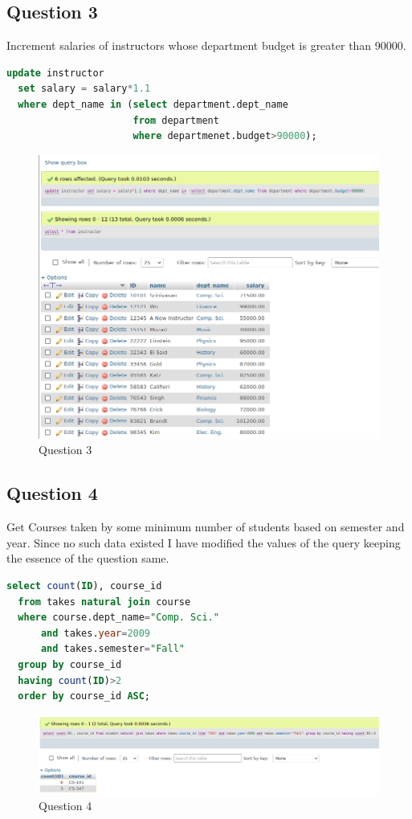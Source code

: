\documentclass{article}
\begin{document}
\subsection{Question 3}
Increment salaries of instructors whose department budget is greater than 90000.
\begin{lstlisting}[language=sql]
  update instructor
  set salary = salary*1.1
  where dept_name in (select department.dept_name 
                      from department 
                      where departmenet.budget>90000);
\end{lstlisting}
\begin{figure}[!ht]
  \begin{center}
  \includegraphics[scale=0.7]{Q8_3.png}
  \caption{Question 3}
  \end{center}
\end{figure}

\newpage

\subsection{Question 4}
Get Courses taken by some minimum number of students based on semester and year. Since no such
data existed I have modified the values of the query keeping the essence of the question same.
\begin{lstlisting}[language=sql]
  select count(ID), course_id
  from takes natural join course
  where course.dept_name="Comp. Sci."
      and takes.year=2009
      and takes.semester="Fall"
  group by course_id
  having count(ID)>2
  order by course_id ASC;
\end{lstlisting}
\begin{figure}[!ht]
  \begin{center}
  \includegraphics[scale=0.7]{Q8_4.png}
  \caption{Question 4}
  \end{center}
\end{figure}
\end{document}
